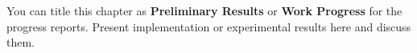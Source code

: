 \documentclass[12pt,oneside,openright,a4paper]{cpe-english-project}
\begin{document}
You can title this chapter as \textbf{Preliminary Results} or \textbf{Work Progress} for the progress reports. Present implementation or experimental results here and discuss them.

%
%
%



\makeatletter
\g@addto@macro{\UrlBreaks}{\UrlOrds}
\makeatother




 \\

 \\
\end{document}
